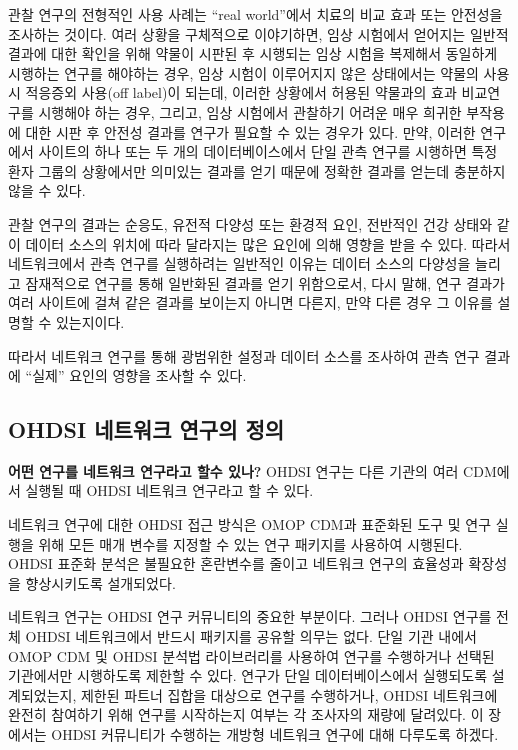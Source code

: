 \documentclass[11pt]{book}
\theoremstyle{definition}
\theoremstyle{definition}
\theoremstyle{definition}
\theoremstyle{remark}
\let\BeginKnitrBlock\begin \let\EndKnitrBlock\end
\begin{document}
관찰 연구의 전형적인 사용 사례는 ``real world''에서 치료의 비교 효과
또는 안전성을 조사하는 것이다. 여러 상황을 구체적으로 이야기하면, 임상
시험에서 얻어지는 일반적 결과에 대한 확인을 위해 약물이 시판된 후
시행되는 임상 시험을 복제해서 동일하게 시행하는 연구를 해야하는 경우,
임상 시험이 이루어지지 않은 상태에서는 약물의 사용시 적응증외 사용(off
label)이 되는데, 이러한 상황에서 허용된 약물과의 효과 비교연구를
시행해야 하는 경우, 그리고, 임상 시험에서 관찰하기 어려운 매우 희귀한
부작용에 대한 시판 후 안전성 결과를 연구가 필요할 수 있는 경우가 있다.
만약, 이러한 연구에서 사이트의 하나 또는 두 개의 데이터베이스에서 단일
관측 연구를 시행하면 특정 환자 그룹의 상황에서만 의미있는 결과를 얻기
때문에 정확한 결과를 얻는데 충분하지 않을 수 있다.

관찰 연구의 결과는 순응도, 유전적 다양성 또는 환경적 요인, 전반적인 건강
상태와 같이 데이터 소스의 위치에 따라 달라지는 많은 요인에 의해 영향을
받을 수 있다. 따라서 네트워크에서 관측 연구를 실행하려는 일반적인 이유는
데이터 소스의 다양성을 늘리고 잠재적으로 연구를 통해 일반화된 결과를
얻기 위함으로서, 다시 말해, 연구 결과가 여러 사이트에 걸쳐 같은 결과를
보이는지 아니면 다른지, 만약 다른 경우 그 이유를 설명할 수 있는지이다.

따라서 네트워크 연구를 통해 광범위한 설정과 데이터 소스를 조사하여 관측
연구 결과에 ``실제'' 요인의 영향을 조사할 수 있다.

\subsection{OHDSI 네트워크 연구의 정의}\label{ohdsi---}

\BeginKnitrBlock{rmdimportant}
\textbf{어떤 연구를 네트워크 연구라고 할수 있나?} OHDSI 연구는 다른
기관의 여러 CDM에서 실행될 때 OHDSI 네트워크 연구라고 할 수 있다.
\EndKnitrBlock{rmdimportant}

네트워크 연구에 대한 OHDSI 접근 방식은 OMOP CDM과 표준화된 도구 및 연구
실행을 위해 모든 매개 변수를 지정할 수 있는 연구 패키지를 사용하여
시행된다. OHDSI 표준화 분석은 불필요한 혼란변수를 줄이고 네트워크 연구의
효율성과 확장성을 향상시키도록 설개되었다.

네트워크 연구는 OHDSI 연구 커뮤니티의 중요한 부분이다. 그러나 OHDSI
연구를 전체 OHDSI 네트워크에서 반드시 패키지를 공유할 의무는 없다. 단일
기관 내에서 OMOP CDM 및 OHDSI 분석법 라이브러리를 사용하여 연구를
수행하거나 선택된 기관에서만 시행하도록 제한할 수 있다. 연구가 단일
데이터베이스에서 실행되도록 설계되었는지, 제한된 파트너 집합을 대상으로
연구를 수행하거나, OHDSI 네트워크에 완전히 참여하기 위해 연구를
시작하는지 여부는 각 조사자의 재량에 달려있다. 이 장에서는 OHDSI
커뮤니티가 수행하는 개방형 네트워크 연구에 대해 다루도록 하겠다.
\end{document}
